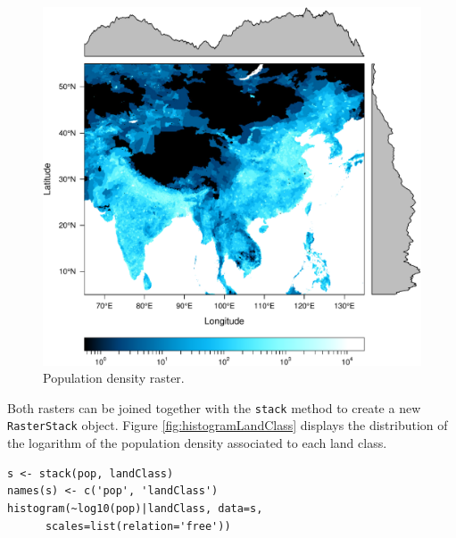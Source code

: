 \documentclass[smallroyalvopaper]{memoir}
\begin{document}
\begin{figure}[htb]
\centering
\includegraphics[width=.9\linewidth]{figs/populationNASA.pdf}
\caption{\label{fig:populationNASA}Population density raster.}
\end{figure}

Both rasters can be joined together with the \texttt{stack} method to
create a new \texttt{RasterStack} object. Figure
\ref{fig:histogramLandClass} displays the distribution of the
logarithm of the population density associated to each land class.


\lstset{language=R,numbers=none}
\begin{lstlisting}
s <- stack(pop, landClass)
names(s) <- c('pop', 'landClass')
histogram(~log10(pop)|landClass, data=s,
	  scales=list(relation='free'))
\end{lstlisting}
\end{document}
